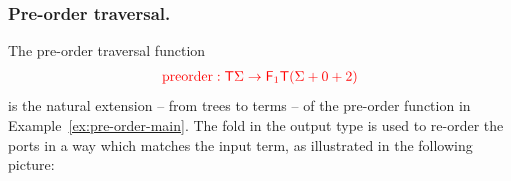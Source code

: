         \subsubsection{Pre-order traversal.} The pre-order traversal function  
        \begin{align*}
            {\color{red}{{\color{red}{\mathrm{preorder}}}: {\color{red}{\mathsf T}}\Sigma \to {\color{red}{\mathsf F_{1}}}{\color{red}{\mathsf T}}({\color{red}{\Sigma}}+ 0 + 2)}}
        \end{align*}
        is the natural extension -- from trees to terms -- of the pre-order function in Example~\ref{ex:pre-order-main}. The fold in the output type is used to re-order the ports in a way which matches the input term, as illustrated in the following picture:
      







